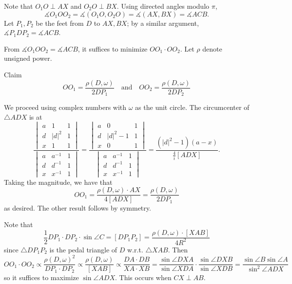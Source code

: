 Note that $O_1O\perp AX$ and $O_2O\perp BX$. Using directed angles modulo $\pi$,
\[
	\measuredangle{O_1OO_2}=\measuredangle{(O_1O,O_2O)}=\measuredangle{(AX,BX)}=\measuredangle{ACB}.
\]
Let $P_1,P_2$ be the feet from $D$ to $AX,BX$; by a similar argument, $\measuredangle{P_1DP_2}=\measuredangle{ACB}$.

From $\measuredangle{O_1OO_2}=\measuredangle{ACB}$, it suffices to minimize $OO_1\cdot OO_2$. Let $\rho$ denote unsigned power.
\begin{greenboxtitle}{Claim}
	\[
		OO_1=\frac{\rho(D,\omega)}{2DP_1}\quad\text{and}\quad OO_2=\frac{\rho(D,\omega)}{2DP_2}
	\]
\end{greenboxtitle}
\begin{lemmaproof}
	We proceed using complex numbers with $\omega$ as the unit circle. The circumcenter of $\triangle{ADX}$ is at
	\[
		\frac{
			\begin{vmatrix}
				a & 1 & 1 \\
				d & |d|^2 & 1 \\
				x & 1 & 1
			\end{vmatrix}
		}{
			\begin{vmatrix}
				a & a^{-1} & 1 \\
				d & d^{-1} & 1 \\
				x & x^{-1} & 1
			\end{vmatrix}
		}
		=
		\frac{
			\begin{vmatrix}
				a & 0 & 1 \\
				d & |d|^2-1 & 1 \\
				x & 0 & 1
			\end{vmatrix}
		}{
			\begin{vmatrix}
				a & a^{-1} & 1 \\
				d & d^{-1} & 1 \\
				x & x^{-1} & 1
			\end{vmatrix}
		}
		=
		\frac{(|d|^2-1)(a-x)}{\frac{4}{i}[ADX]}.
	\]
	Taking the magnitude, we have that
	\[
		OO_1=\frac{\rho(D,\omega)\cdot AX}{4[ADX]}=\frac{\rho(D,\omega)}{2DP_1}
	\]
	as desired. The other result follows by symmetry.
\end{lemmaproof}
Note that
\[
	\frac{1}{2}DP_1\cdot DP_2\cdot\sin\angle{C}=[DP_1P_2]=\frac{\rho(D,\omega)\cdot[XAB]}{4R^2}
\]
since $\triangle{DP_1P_2}$ is the pedal triangle of $D$ w.r.t. $\triangle{XAB}$. Then
\[
	OO_1\cdot OO_2\propto\frac{\rho(D,\omega)^2}{DP_1\cdot DP_2}\propto\frac{\rho(D,\omega)}{[XAB]}\propto\frac{DA\cdot DB}{XA\cdot XB}=\frac{\sin\angle{DXA}}{\sin\angle{XDA}}\cdot\frac{\sin\angle{DXB}}{\sin\angle{XDB}}=\frac{\sin\angle{B}\sin\angle{A}}{\sin^2{\angle{ADX}}}
\]
so it suffices to maximize $\sin\angle{ADX}$. This occurs when $CX\perp AB$.